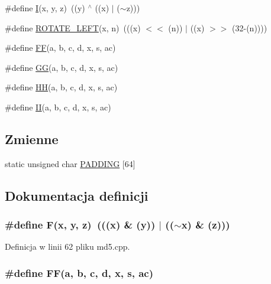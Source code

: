 \begin{CompactItemize}
\#define \hyperlink{a00009_c0eafdc9ee161b71e7af98af736952fd}{I}(x, y, z)~((y) $^\wedge$ ((x) $|$ ($\sim$z)))
\item 
\#define \hyperlink{a00009_7417fd4e875360c0533fa5b412cdab49}{ROTATE\_\-LEFT}(x, n)~(((x) $<$$<$ (n)) $|$ ((x) $>$$>$ (32-(n))))
\item 
\#define \hyperlink{a00009_0a143972cb6c4fe16f0ffa8a3d41ebf3}{FF}(a, b, c, d, x, s, ac)
\item 
\#define \hyperlink{a00009_685f32faa2a66e743850b990a13b8bfa}{GG}(a, b, c, d, x, s, ac)
\item 
\#define \hyperlink{a00009_8b9f1c4778df01ef970b87dbe5541dc5}{HH}(a, b, c, d, x, s, ac)
\item 
\#define \hyperlink{a00009_d26626e5efb37b2dadef4e88e35e4329}{II}(a, b, c, d, x, s, ac)
\end{CompactItemize}
\subsection*{Zmienne}
\begin{CompactItemize}
\item 
static unsigned char \hyperlink{a00009_ee6f420120b0fbc0fb096cb61655cec4}{PADDING} \mbox{[}64\mbox{]}
\end{CompactItemize}


\subsection{Dokumentacja definicji}
\hypertarget{a00009_96d73bbd7af15cb1fc38c3f4a3bd82e9}{
\subsubsection[{F}]{\setlength{\rightskip}{0pt plus 5cm}\#define F(x, \/  y, \/  z)~(((x) \& (y)) $|$ (($\sim$x) \& (z)))}}
\label{da/da0/a00009_96d73bbd7af15cb1fc38c3f4a3bd82e9}




Definicja w linii 62 pliku md5.cpp.\hypertarget{a00009_0a143972cb6c4fe16f0ffa8a3d41ebf3}{
\subsubsection[{FF}]{\setlength{\rightskip}{0pt plus 5cm}\#define FF(a, \/  b, \/  c, \/  d, \/  x, \/  s, \/  ac)}}
\label{da/da0/a00009_0a143972cb6c4fe16f0ffa8a3d41ebf3}


